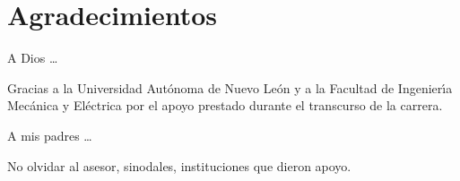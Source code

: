 \chapter*{Agradecimientos}

A Dios \ldots

Gracias a la Universidad Aut\'{o}noma de Nuevo Le\'{o}n y a la Facultad de Ingenier\'{\i}a Mec\'{a}nica y El\'{e}ctrica por el apoyo prestado durante el transcurso de la carrera.

A mis padres \ldots

No olvidar al asesor, sinodales, instituciones que dieron apoyo.

\newpage

